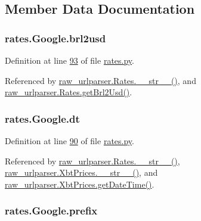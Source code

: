 \subsection{Member Data Documentation}
\subsubsection[{\texorpdfstring{brl2usd}{brl2usd}}]{\setlength{\rightskip}{0pt plus 5cm}rates.\+Google.\+brl2usd}\hypertarget{classrates_1_1_google_a0979ffcb18b8bf3156cc5735c67ca6df}{}\label{classrates_1_1_google_a0979ffcb18b8bf3156cc5735c67ca6df}


Definition at line \hyperlink{rates_8py_source_l00093}{93} of file \hyperlink{rates_8py_source}{rates.\+py}.



Referenced by \hyperlink{raw__urlparser_8py_source_l00038}{raw\+\_\+urlparser.\+Rates.\+\_\+\+\_\+str\+\_\+\+\_\+()}, and \hyperlink{raw__urlparser_8py_source_l00029}{raw\+\_\+urlparser.\+Rates.\+get\+Brl2\+Usd()}.

\subsubsection[{\texorpdfstring{dt}{dt}}]{\setlength{\rightskip}{0pt plus 5cm}rates.\+Google.\+dt}\hypertarget{classrates_1_1_google_a76574be36237f78780f76bed53e69ab2}{}\label{classrates_1_1_google_a76574be36237f78780f76bed53e69ab2}


Definition at line \hyperlink{rates_8py_source_l00090}{90} of file \hyperlink{rates_8py_source}{rates.\+py}.



Referenced by \hyperlink{raw__urlparser_8py_source_l00038}{raw\+\_\+urlparser.\+Rates.\+\_\+\+\_\+str\+\_\+\+\_\+()}, \hyperlink{raw__urlparser_8py_source_l00074}{raw\+\_\+urlparser.\+Xbt\+Prices.\+\_\+\+\_\+str\+\_\+\+\_\+()}, and \hyperlink{raw__urlparser_8py_source_l00059}{raw\+\_\+urlparser.\+Xbt\+Prices.\+get\+Date\+Time()}.

\subsubsection[{\texorpdfstring{prefix}{prefix}}]{\setlength{\rightskip}{0pt plus 5cm}rates.\+Google.\+prefix}\hypertarget{classrates_1_1_google_ada5de8700ad571d0ab819fa0163d6bbe}{}\label{classrates_1_1_google_ada5de8700ad571d0ab819fa0163d6bbe}


